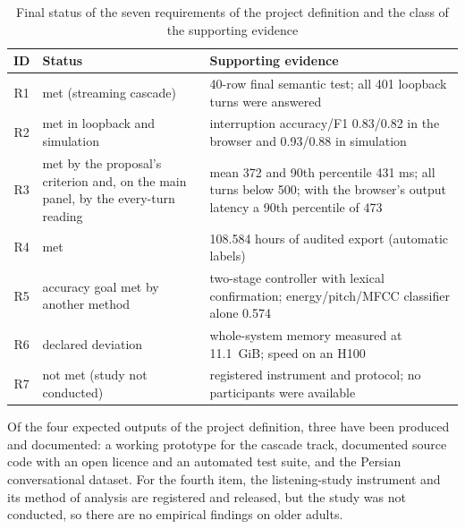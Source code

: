 \begin{table}[ht]
\centering
\caption{Final status of the seven requirements of the project definition and the class of the
         supporting evidence}
\label{tab:req-status}
\small
\begin{tabular}{cL{4.2cm}L{6.2cm}}
\toprule
\textbf{ID} & \textbf{Status} & \textbf{Supporting evidence} \\
\midrule
R1 & met (streaming cascade) &
     40-row final semantic test; all 401 loopback turns were answered \\
R2 & met in loopback and simulation &
     interruption accuracy/F1 0.83/0.82 in the browser and 0.93/0.88 in simulation \\
R3 & met by the proposal's criterion and, on the main panel, by the every-turn reading &
     mean 372 and 90th percentile 431 ms; all turns below 500; with the browser's output latency a 90th percentile of 473 \\
R4 & met &
     108.584 hours of audited export (automatic labels) \\
R5 & accuracy goal met by another method &
     two-stage controller with lexical confirmation; energy/pitch/MFCC classifier alone 0.574 \\
R6 & declared deviation &
     whole-system memory measured at 11.1~GiB; speed on an H100 \\
R7 & not met (study not conducted) &
     registered instrument and protocol; no participants were available \\
\bottomrule
\end{tabular}
\end{table}


Of the four expected outputs of the project definition, three have been produced and documented:
a working prototype for the cascade track, documented source code with an open licence and an
automated test suite, and the Persian conversational dataset. For the fourth item, the
listening-study instrument and its method of analysis are registered and released, but the study was
not conducted, so there are no empirical findings on older adults.
